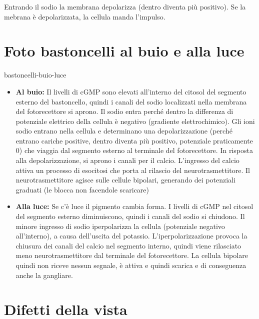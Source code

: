 \documentclass[preview]{standalone}
\begin{document}
\begin{plainhtml}
    Entrando il sodio la membrana depolarizza (dentro diventa più positivo).
    Se la mebrana è depolarizzata, la cellula manda l'impulso.
\end{plainhtml}

\section{Foto bastoncelli al buio e alla luce}

\begin{snippet}{bastoncelli-buio-luce}
    \begin{itemize}
        \item \textbf{Al buio:}
            Il livelli di cGMP sono elevati all'interno del citosol del segmento esterno
            del bastoncello, quindi i canali del sodio localizzati nella membrana del fotorecettore
            si aprono. Il sodio entra perché dentro la differenza di potenziale
            elettrico della cellula è negativo (gradiente elettrochimico).
            Gli ioni sodio entrano nella cellula e determinano una depolarizzazione
            (perché entrano cariche positive, dentro diventa più positivo, potenziale praticamente 0) che viaggia
            dal segmento esterno al terminale del fotorecettore. 
            In risposta alla depolarizzazione, si aprono i canali per il calcio.
            L'ingresso del calcio attiva un processo di esocitosi che porta al rilascio del neurotrasmettitore.
            Il neurotrasmettitore agisce sulle cellule bipolari, generando dei potenziali graduati (le blocca non facendole scaricare)
        \item \textbf{Alla luce:}
            Se c'è luce il pigmento cambia forma. I livelli di cGMP nel citosol del segmento esterno diminuiscono, quindi i canali del sodio si chiudono.
            Il minore ingresso di sodio iperpolarizza la cellula (potenziale negativo all'interno),
            a causa dell'uscita del potassio.
            L'iperpolarizzazione provoca la chiusura dei canali del calcio nel segmento interno,
            quindi viene rilasciato meno neurotrasmettitore dal terminale del fotorecettore.
            La cellula bipolare quindi non riceve nessun segnale, è attiva e quindi scarica
            e di conseguenza anche la gangliare.
    \end{itemize}
\end{snippet}

\section{Difetti della vista}
\end{document}
